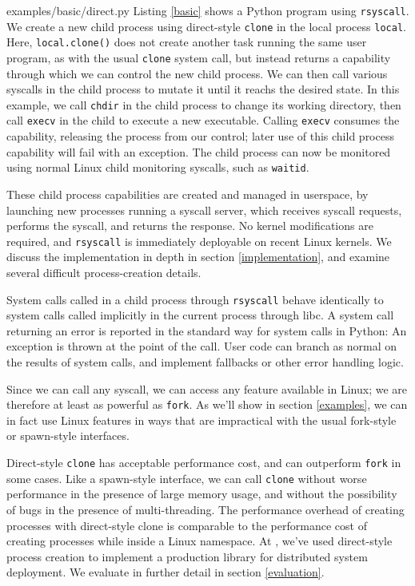 \documentclass[letterpaper,twocolumn,10pt]{article}
\begin{document}

{examples/basic/direct.py}
Listing \ref{basic} shows a Python program using \texttt{rsyscall}.
We create a new child process using direct-style \texttt{clone} in the local process \verb|local|.
Here, \texttt{local.clone()} does not create another task running the same user program,
as with the usual \texttt{clone} system call,
but instead returns a capability through which we can control the new child process.
We can then call various syscalls in the child process to mutate it until it reachs the desired state.
In this example,
we call \texttt{chdir} in the child process to change its working directory,
then call \texttt{execv} in the child to execute a new executable.
Calling \texttt{execv} consumes the capability,
releasing the process from our control;
later use of this child process capability will fail with an exception.
The child process can now be monitored using normal Linux child monitoring syscalls,
such as \texttt{waitid}.

These child process capabilities are created and managed in userspace,
by launching new processes running a syscall server,
which receives syscall requests, performs the syscall, and returns the response.
No kernel modifications are required, and \texttt{rsyscall} is immediately deployable on recent Linux kernels.
We discuss the implementation in depth in section \ref{implementation},
and examine several difficult process-creation details.

System calls called in a child process through \texttt{rsyscall}
behave identically to system calls called implicitly in the current process through libc.
A system call returning an error is reported in the standard way for system calls in Python:
An exception is thrown at the point of the call.
User code can branch as normal on the results of system calls,
and implement fallbacks or other error handling logic.

Since we can call any syscall,
we can access any feature available in Linux; we are therefore at least as powerful as \texttt{fork}.
As we'll show in section \ref{examples},
we can in fact use Linux features in ways that are impractical with the usual fork-style or spawn-style interfaces.

Direct-style \texttt{clone} has acceptable performance cost,
and can outperform \texttt{fork} in some cases.
Like a spawn-style interface,
we can call \texttt{clone}
without worse performance in the presence of large memory usage,
and without the possibility of bugs in the presence of multi-threading.
The performance overhead of creating processes with direct-style clone
is comparable to the performance cost of creating processes while inside a Linux namespace.
At \twosigma{}, we've used direct-style process creation
to implement a production library for distributed system deployment.
We evaluate in further detail in section \ref{evaluation}.
\end{document}
